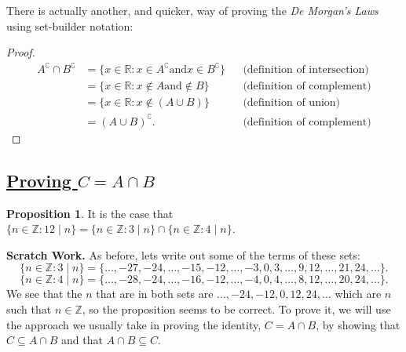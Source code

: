 \documentclass{amsart} %
\theoremstyle{definition} %
\theoremstyle{definition}
\newtheorem*{prpn}{Proposition}
\theoremstyle{remark} %
\begin{document}
There is actually another, and quicker, way of proving the \emph{De Morgan's Laws} using set-builder notation:

\begin{proof}
      \begin{align*} %
            A^\complement \cap B^\complement
            &= \{x \in \mathbb{R}: x \in A^\complement \text{and} x\in B^\complement \} && \text{(definition of intersection)} \\
            &= \{x \in \mathbb{R}: x \not\in A \text{and} \not\in B \} && \text{(definition of complement)} \\
            &= \{x \in \mathbb{R}: x \not\in (A \cup B) \} && \text{(definition of union)} \\
            &= (A \cup B)^\complement. && \text{(definition of complement)}
      \end{align*}
\end{proof}












\bigskip \bigskip

\subsection{\underline{Proving $C = A \cap B$}}

\begin{prpn}
      It is the case that $\{n \in \mathbb{Z}: 12\mid n \} = \{n \in \mathbb{Z}: 3\mid n \} \cap \{n \in \mathbb{Z}: 4\mid n \}$.
\end{prpn}

\noindent \textbf{Scratch Work.} As before, lets write out some of the terms of these sets:
                  \[ \{n \in \mathbb{Z}:3\mid n \} = \{\dots, -27, -24, \dots, -15, -12, \dots, -3, 0, 3, \dots, 9, 12, \dots, 21, 24, \dots \}. \]
                  \[ \{n \in \mathbb{Z}:4\mid n \} = \{\dots, -28, -24, \dots, -16, -12, \dots, -4, 0, 4, \dots, 8, 12, \dots, 20, 24, \dots \}. \]
                  \indent We see that the $n$ that are in both sets are $\dots, -24, -12, 0, 12, 24, \dots$ which are $n$ such that $n \in \mathbb{Z}$, so the proposition seems to be correct. To prove it, we will use the approach we usually take in proving the identity, $C = A \cap B$, by showing that $C \subseteq A \cap B$ and that $A \cap B \subseteq C$.
\end{document}
